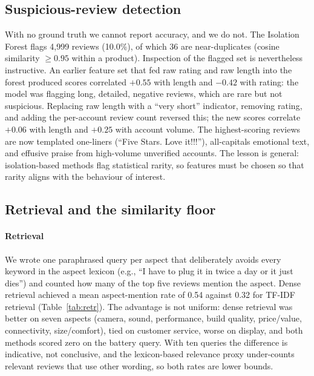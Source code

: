 \documentclass[conference]{IEEEtran}
\begin{document}
\subsection{Suspicious-review detection}
With no ground truth we cannot report accuracy, and we do not. The Isolation Forest flags 4{,}999 reviews (10.0\%), of which 36 are near-duplicates (cosine similarity $\ge0.95$ within a product). Inspection of the flagged set is nevertheless instructive. An earlier feature set that fed raw rating and raw length into the forest produced scores correlated $+0.55$ with length and $-0.42$ with rating: the model was flagging long, detailed, negative reviews, which are rare but not suspicious. Replacing raw length with a ``very short'' indicator, removing rating, and adding the per-account review count reversed this; the new scores correlate $+0.06$ with length and $+0.25$ with account volume. The highest-scoring reviews are now templated one-liners (``Five Stars. Love it!!!''), all-capitals emotional text, and effusive praise from high-volume unverified accounts. The lesson is general: isolation-based methods flag statistical rarity, so features must be chosen so that rarity aligns with the behaviour of interest.

\subsection{Retrieval and the similarity floor}
\paragraph{Retrieval} We wrote one paraphrased query per aspect that deliberately avoids every keyword in the aspect lexicon (e.g., ``I have to plug it in twice a day or it just dies'') and counted how many of the top five reviews mention the aspect. Dense retrieval achieved a mean aspect-mention rate of 0.54 against 0.32 for TF-IDF retrieval (Table~\ref{tab:retr}). The advantage is not uniform: dense retrieval was better on seven aspects (camera, sound, performance, build quality, price/value, connectivity, size/comfort), tied on customer service, worse on display, and both methods scored zero on the battery query. With ten queries the difference is indicative, not conclusive, and the lexicon-based relevance proxy under-counts relevant reviews that use other wording, so both rates are lower bounds.
\end{document}
